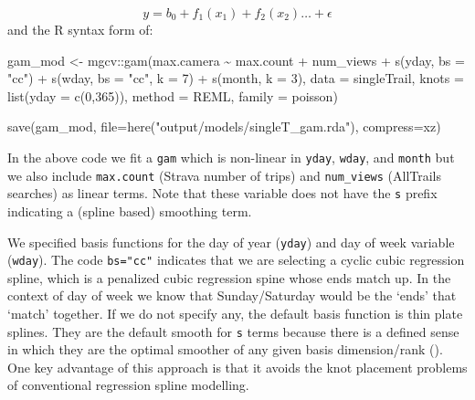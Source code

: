 \documentclass[
]{book}
\newenvironment{Shaded}{\begin{snugshade}}{\end{snugshade}}
\newcommand{\AttributeTok}[1]{\textcolor[rgb]{0.77,0.63,0.00}{#1}}
\newcommand{\DecValTok}[1]{\textcolor[rgb]{0.00,0.00,0.81}{#1}}
\newcommand{\FunctionTok}[1]{\textcolor[rgb]{0.00,0.00,0.00}{#1}}
\newcommand{\NormalTok}[1]{#1}
\newcommand{\OtherTok}[1]{\textcolor[rgb]{0.56,0.35,0.01}{#1}}
\newcommand{\SpecialCharTok}[1]{\textcolor[rgb]{0.00,0.00,0.00}{#1}}
\newcommand{\StringTok}[1]{\textcolor[rgb]{0.31,0.60,0.02}{#1}}
\begin{document}
\[
y = b_0 + f_1(x_1) + f_2(x_2)\dots + \epsilon
\]
and the R syntax form of:

\begin{Shaded}
\begin{Highlighting}[]
\NormalTok{gam\_mod }\OtherTok{\textless{}{-}}\NormalTok{ mgcv}\SpecialCharTok{::}\FunctionTok{gam}\NormalTok{(max.camera }\SpecialCharTok{\textasciitilde{}} 
\NormalTok{                       max.count }\SpecialCharTok{+}
\NormalTok{                       num\_views }\SpecialCharTok{+}
                       \FunctionTok{s}\NormalTok{(yday, }\AttributeTok{bs =} \StringTok{"cc"}\NormalTok{) }\SpecialCharTok{+} 
                       \FunctionTok{s}\NormalTok{(wday, }\AttributeTok{bs =} \StringTok{"cc"}\NormalTok{,  }\AttributeTok{k =} \DecValTok{7}\NormalTok{) }\SpecialCharTok{+}
                       \FunctionTok{s}\NormalTok{(month, }\AttributeTok{k =} \DecValTok{3}\NormalTok{), }
                     \AttributeTok{data =}\NormalTok{ singleTrail, }
                     \AttributeTok{knots =} \FunctionTok{list}\NormalTok{(}\AttributeTok{yday =} \FunctionTok{c}\NormalTok{(}\DecValTok{0}\NormalTok{,}\DecValTok{365}\NormalTok{)),}
                     \AttributeTok{method =} \StringTok{\textquotesingle{}REML\textquotesingle{}}\NormalTok{,}
                     \AttributeTok{family =}\NormalTok{ poisson)}

\FunctionTok{save}\NormalTok{(gam\_mod, }
     \AttributeTok{file=}\FunctionTok{here}\NormalTok{(}\StringTok{"output/models/singleT\_gam.rda"}\NormalTok{), }
     \AttributeTok{compress=}\StringTok{\textquotesingle{}xz\textquotesingle{}}\NormalTok{)}
\end{Highlighting}
\end{Shaded}

In the above code we fit a \texttt{gam} which is non-linear in \texttt{yday}, \texttt{wday}, and \texttt{month} but we also include \texttt{max.count} (Strava number of trips) and \texttt{num\_views} (AllTrails searches) as linear terms. Note that these variable does not have the \texttt{s} prefix indicating a (spline based) smoothing term.

We specified basis functions for the day of year (\texttt{yday}) and day of week variable (\texttt{wday}). The code \texttt{bs="cc"} indicates that we are selecting a cyclic cubic regression spline, which is a penalized cubic regression spine whose ends match up. In the context of day of week we know that Sunday/Saturday would be the `ends' that `match' together. If we do not specify any, the default basis function is thin plate splines. They are the default smooth for \texttt{s} terms because there is a defined sense in which they are the optimal smoother of any given basis dimension/rank (\citep{R-Wood5}). One key advantage of this approach is that it avoids the knot placement problems of conventional regression spline modelling.
\end{document}
